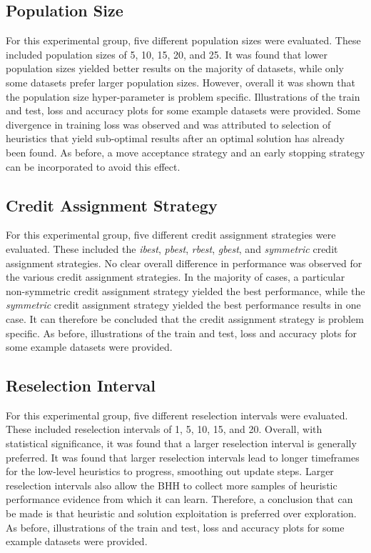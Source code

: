 \subsection{Population Size}
\label{sec:conclusion:results:summary:population_size}

For this experimental group, five different population sizes were evaluated. These included population sizes of 5, 10, 15, 20, and 25. It was found that lower population sizes yielded better results on the majority of datasets, while only some datasets prefer larger population sizes. However, overall it was shown that the population size hyper-parameter is problem specific. Illustrations of the train and test, loss and accuracy plots for some example datasets were provided. Some divergence in training loss was observed and was attributed to selection of heuristics that yield sub-optimal results after an optimal solution has already been found. As before, a move acceptance strategy and an early stopping strategy can be incorporated to avoid this effect.

\subsection{Credit Assignment Strategy}
\label{sec:conclusion:results:summary:credit}

For this experimental group, five different credit assignment strategies were evaluated. These included the \textit{ibest}, \textit{pbest}, \textit{rbest}, \textit{gbest}, and \textit{symmetric} credit assignment strategies. No clear overall difference in performance was observed for the various credit assignment strategies. In the majority of cases, a particular non-symmetric credit assignment strategy yielded the best performance, while the \textit{symmetric} credit assignment strategy yielded the best performance results in one case. It can therefore be concluded that the credit assignment strategy is problem specific. As before, illustrations of the train and test, loss and accuracy plots for some example datasets were provided.

\subsection{Reselection Interval}
\label{sec:conclusion:results:summary:reselection}

For this experimental group, five different reselection intervals were evaluated. These included reselection intervals of 1, 5, 10, 15, and 20. Overall, with statistical significance, it was found that a larger reselection interval is generally preferred. It was found that larger reselection intervals lead to longer timeframes for the low-level heuristics to progress, smoothing out update steps. Larger reselection intervals also allow the \acs{BHH} to collect more samples of heuristic performance evidence from which it can learn. Therefore, a conclusion that can be made is that heuristic and solution exploitation is preferred over exploration. As before, illustrations of the train and test, loss and accuracy plots for some example datasets were provided.


